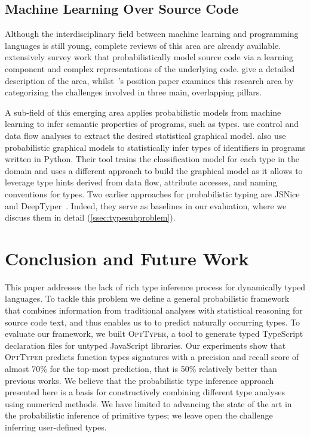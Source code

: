 \documentclass[sigplan,10pt,review,anonymous]{acmart} %
\newcommand{\projectname}{\textsc{OptTyper}\xspace}
\theoremstyle{plain}
\theoremstyle{remark}
\theoremstyle{definition}
\begin{document}
\subsection{Machine Learning Over Source Code}

Although the interdisciplinary field between machine learning and programming
languages is still young, complete reviews of this area are
already available.
%
\citet{allamanis17} extensively survey
work that probabilistically model source code via
a learning component and complex representations of the underlying
code.
%
\citet{vechev16} give
a detailed description of the area, whilst~\citet{threepillars}'s
position paper examines this research area by categorizing
the challenges involved in three main, overlapping pillars.

A sub-field of this
emerging area applies probabilistic models from machine learning to infer semantic
properties of programs, such as types.
%
\citet{chibotaru19} use control and data flow analyses to extract
the desired statistical graphical model.
%
\citet{xu16} also use probabilistic graphical models to statistically infer
types of identifiers in programs written in Python. Their tool trains the
classification model for each type in the domain and uses a different
approach to build the graphical model as it allows to leverage type hints
derived from data flow, attribute accesses, and naming conventions for types.
%
Two earlier approaches for probabilistic typing are JSNice~\citep{raychev15} and
DeepTyper~\citep{hellendoorn18}.
Indeed, they serve as baselines in our evaluation, where we discuss them in
detail (\autoref{ssec:typesubproblem}).


\section{Conclusion and Future Work}
\label{sec:conclusion}

This paper addresses the lack of rich type inference process for
dynamically typed languages.
%
To tackle this problem we define a
general probabilistic framework that combines
information from traditional analyses with statistical reasoning
for source code text, and thus enables us to to predict naturally occurring
types.
%
To evaluate our framework, we built \projectname{}, a tool to
generate typed TypeScript declaration files for untyped JavaScript
libraries.
%
Our experiments show that \projectname{} predicts function types
signatures with a precision and recall score of almost 70\% for the top-most
prediction, that is 50\% relatively better than previous works.
We believe that the probabilistic type inference approach presented here
is a basis for constructively combining different type analyses using numerical methods.
%
We have limited to advancing the state of the art in the probabilistic inference
of primitive types; we leave open the challenge inferring user-defined types.
\end{document}
